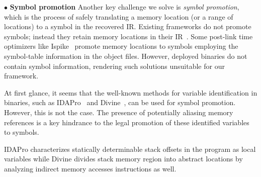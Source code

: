 
\noindent $\bullet$ \textbf{Symbol promotion} Another key challenge we solve is \emph{symbol promotion}, which is the process of safely translating a memory location (or a range of locations) to a symbol in the recovered IR. Existing frameworks do not promote symbols; instead they retain memory locations in their IR~\cite{plto,Diablo1,pintool,dyninst94,newEtch}. Some post-link time optimizers like Ispike~\cite{ispike} promote memory locations to symbols employing the symbol-table information in the object files. However, deployed binaries do not contain symbol information, rendering such solutions unsuitable for our framework.

At first glance, it seems that the well-known methods for variable identification in binaries, such as IDAPro~\cite{ida-pro} and Divine~\cite{reps06}, can be used for symbol promotion. However, this is not the case. The presence of potentially aliasing memory references is a key hindrance to the legal promotion of these identified variables to symbols.

IDAPro characterizes statically determinable stack offsets in the program as local variables while Divine divides stack memory region into abstract locations by analyzing indirect memory accesses instructions as well. 


